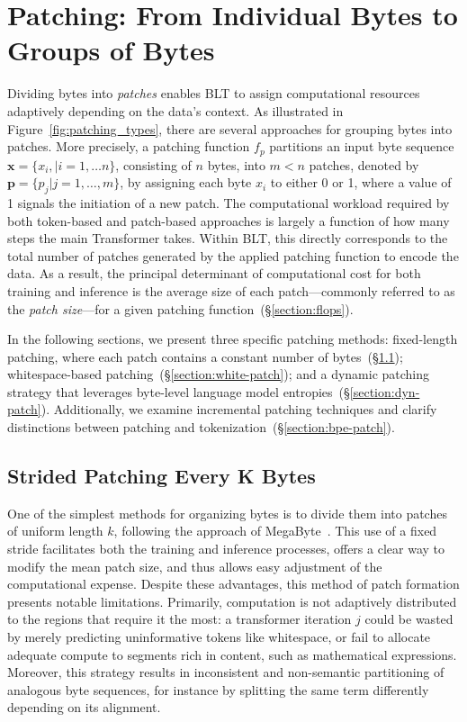 \section{Patching: From Individual Bytes to Groups of Bytes}
\label{section:patching}

Dividing bytes into \textit{patches} enables {\textsc BLT} to assign computational resources adaptively depending on the data’s context. As illustrated in Figure~\ref{fig:patching_types}, there are several approaches for grouping bytes into patches. More precisely, a patching function $f_p$ partitions an input byte sequence $\pmb{x}=\{x_i,|i=1,\ldots n\}$, consisting of $n$ bytes, into $m < n$ patches, denoted by $\pmb{p}=\{p_j|j=1,\ldots,m\}$, by assigning each byte $x_i$ to either 0 or 1, where a value of 1 signals the initiation of a new patch. The computational workload required by both token-based and patch-based approaches is largely a function of how many steps the main Transformer takes. Within {\textsc BLT}, this directly corresponds to the total number of patches generated by the applied patching function to encode the data. As a result, the principal determinant of computational cost for both training and inference is the average size of each patch—commonly referred to as the \textit{patch size}—for a given patching function~(\S\ref{section:flops}).

In the following sections, we present three specific patching methods: fixed-length patching, where each patch contains a constant number of bytes~(\S\ref{section:static-patch}); whitespace-based patching~(\S\ref{section:white-patch}); and a dynamic patching strategy that leverages byte-level language model entropies~(\S\ref{section:dyn-patch}). Additionally, we examine incremental patching techniques and clarify distinctions between patching and tokenization~(\S\ref{section:bpe-patch}).

\subsection{Strided Patching Every K Bytes}
\label{section:static-patch}

One of the simplest methods for organizing bytes is to divide them into patches of uniform length $k$, following the approach of MegaByte~\citep{yu2023megabyte}. This use of a fixed stride facilitates both the training and inference processes, offers a clear way to modify the mean patch size, and thus allows easy adjustment of the computational expense. Despite these advantages, this method of patch formation presents notable limitations. Primarily, computation is not adaptively distributed to the regions that require it the most: a transformer iteration $j$ could be wasted by merely predicting uninformative tokens like whitespace, or fail to allocate adequate compute to segments rich in content, such as mathematical expressions. Moreover, this strategy results in inconsistent and non-semantic partitioning of analogous byte sequences, for instance by splitting the same term differently depending on its alignment.

